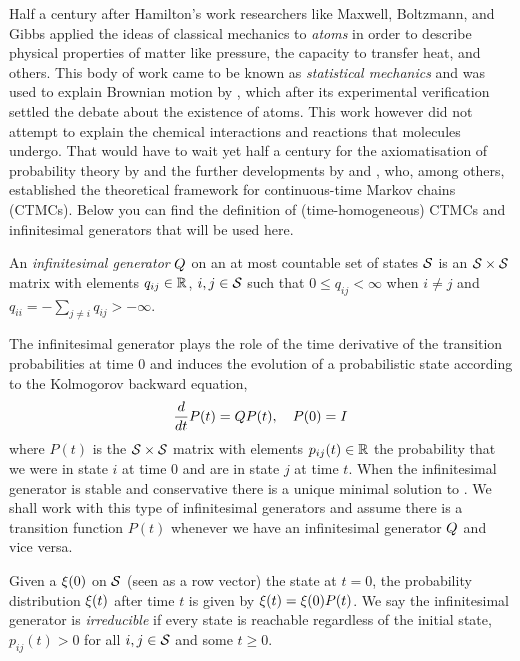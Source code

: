Half a century after Hamilton's work
researchers like Maxwell, Boltzmann, and Gibbs
applied the ideas of classical mechanics to \emph{atoms}
in order to describe physical properties of matter like pressure,
the capacity to transfer heat, and others.
This body of work came to be known as \emph{statistical mechanics}
and was used to explain Brownian motion by \citet{einstein-brownian},
which after its experimental verification \citep{perrin}
settled the debate about the existence of atoms.
This work however did not attempt to explain
the chemical interactions and reactions that molecules undergo.
That would have to wait yet half a century
for the axiomatisation of probability theory by \citet{kolmogorov}
and the further developments by \citet{doob} and \citet{feller},
who, among others, established the theoretical framework
for continuous-time Markov chains (CTMCs).
Below you can find the definition of (time-homogeneous) CTMCs
and infinitesimal generators that will be used here.

\begin{definition}%
  An \emph{infinitesimal generator} $Q$
  on an at most countable set of states $\mathcal{S}$
  is an $\mathcal{S} \times \mathcal{S}$ matrix
  with elements $q_{ij} \in \mathbb{R}$, $i,j \in \mathcal{S}$
  such that $0 \leqslant q_{ij} < \infty$ when $i \neq j$
  and $q_{ii} = - \sum_{j \neq i} q_{ij} > -\infty$.
\end{definition}

The infinitesimal generator plays the role of
the time derivative of the transition probabilities at time $0$
and induces the evolution of a probabilistic state
according to the Kolmogorov backward equation,
\begin{equation}
  \label{eq:transition-function}
  \frac{d}{dt} P(t) = Q P(t), \quad P(0) = I
\end{equation}
where $P(t)$ is the $\mathcal{S} \times \mathcal{S}$ matrix
with elements $p_{ij}(t) \in \mathbb{R}$ the probability that
we were in state $i$ at time $0$ and are in state $j$ at time $t$.
When the infinitesimal generator is stable and conservative
there is a unique minimal solution to 
\citep{anderson}.
We shall work with this type of infinitesimal generators
and assume there is a transition function $P(t)$
whenever we have an infinitesimal generator $Q$ and vice versa.

Given a \pmf $\xi(0)$ on $\mathcal{S}$ (seen as a row vector)
the state at $t = 0$,
the probability distribution $\xi(t)$ after time $t$
is given by $\xi(t) = \xi(0) P(t)$.
We say the infinitesimal generator is \emph{irreducible}
if every state is reachable regardless of the initial state,
\ie $p_{ij}(t) > 0$ for all $i,j \in \mathcal{S}$
and some $t \geqslant 0$.

